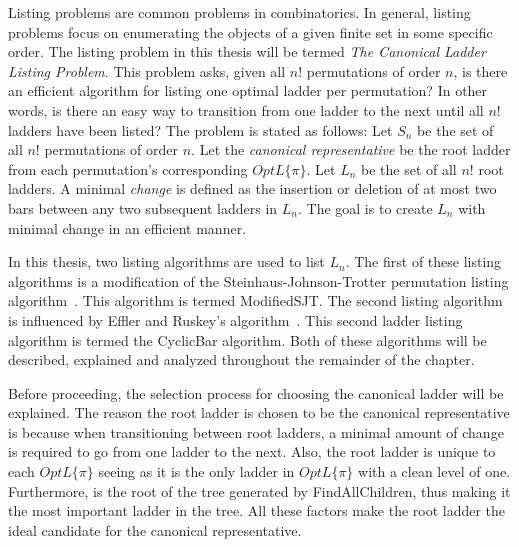 Listing problems are common problems in combinatorics. In general, listing problems 
focus on enumerating the objects of a given finite set in some specific order. The listing problem in this thesis 
will be termed \emph{The Canonical Ladder Listing Problem}. This problem asks, given all $n!$ permutations of order $n$, is there an efficient algorithm for listing 
one optimal ladder per permutation? In other words, is there an easy way to transition from one ladder to the next until all $n!$ ladders 
have been listed? The problem is stated as follows: Let $S_{n}$ be the set of all $n!$ permutations of order $n$. 
Let the \emph{canonical representative} be the root ladder from each permutation's corresponding $OptL\{\pi\}$. Let $L_{n}$ be the set of 
all $n!$ root ladders. A minimal \emph{change} 
is defined as the insertion or deletion of at most two bars between any two subsequent ladders in $L_{n}$. The goal is 
to create $L_{n}$ with minimal change in an efficient manner.\par
In this thesis, two listing algorithms are used to list $L_{n}$. The first of these listing algorithms 
is a modification of the {\sc Steinhaus-Johnson-Trotter} permutation listing algorithm~\cite{A25}.
This algorithm is termed {\sc ModifiedSJT}.
The second listing algorithm is influenced by Effler and Ruskey's algorithm~\cite{A26}. 
This second ladder listing algorithm is termed the {\sc CyclicBar} algorithm. Both of these algorithms will 
be described, explained and analyzed throughout the remainder of the chapter.\par
Before proceeding, the selection process for choosing the canonical ladder will be explained.
The reason the root ladder is chosen to be the canonical representative is because 
when transitioning between root ladders, a minimal amount of change is required 
to go from one ladder to the next. Also, the root ladder is unique to each 
$OptL\{\pi\}$ seeing as it is the only ladder in $OptL\{\pi\}$ with a clean level of one. 
Furthermore, is the root of the tree generated by {\sc FindAllChildren}, 
thus making it the most important ladder in the tree. All these factors make the root ladder 
the ideal candidate for the canonical representative.

